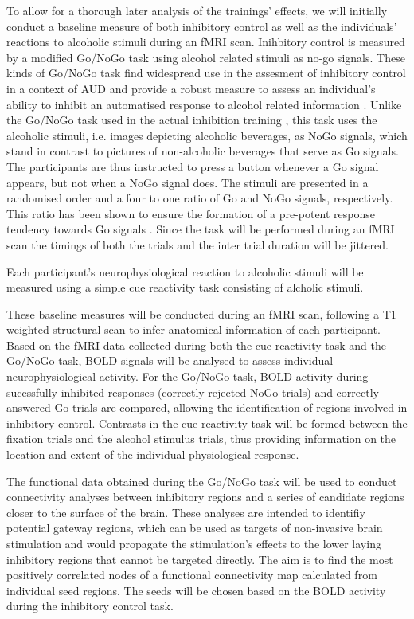 \documentclass[12pt]{article}
\begin{document}
To allow for a thorough later analysis of the trainings' effects, we will initially conduct a baseline measure of both inhibitory control as well as the individuals' reactions to alcoholic stimuli during an fMRI scan. Inihbitory control is measured by a modified Go/NoGo task using alcohol related stimuli as no-go signals. These kinds of Go/NoGo task find widespread use in the assesment of inhibitory control in a context of AUD and provide a robust measure to assess an individual's ability to inhibit an automatised response to alcohol related information \parencite{amesNeuralCorrelatesGo2014,bowleyEffectsInhibitoryControl2013,roseEffectsAlcoholInhibitory2008,simmondsMetaanalysisGoNogo2008}. Unlike the Go/NoGo task used in the actual inhibition training \parencite{houbenBeerNogoLearning2012}, this task uses the alcoholic stimuli, i.e. images depicting alcoholic beverages, as NoGo signals, which stand in contrast to pictures of non-alcoholic beverages that serve as Go signals. The participants are thus instructed to press a button whenever a Go signal appears, but not when a NoGo signal does. The stimuli are presented in a randomised order and a four to one ratio of Go and NoGo signals, respectively. This ratio has been shown to ensure the formation of a pre-potent response tendency towards Go signals \parencite{amesNeuralCorrelatesGo2014}. Since the task will be performed during an fMRI scan the timings of both the trials and the inter trial duration will be jittered.

Each participant's neurophysiological reaction to alcoholic stimuli will be measured using a simple cue reactivity task consisting of alcholic stimuli. 

These baseline measures will be conducted during an fMRI scan, following a T1 weighted structural scan to infer anatomical information of each participant. Based on the fMRI data collected during both the cue reactivity task and the Go/NoGo task, BOLD signals will be analysed to assess individual neurophysiological activity. For the Go/NoGo task, BOLD activity during sucessfully inhibited responses (correctly rejected NoGo trials) and correctly answered Go trials are compared, allowing the identification of regions involved in inhibitory control. Contrasts in the cue reactivity task will be formed between the fixation trials and the alcohol stimulus trials, thus providing information on the location and extent of the individual physiological response.

The functional data obtained during the Go/NoGo task will be used to conduct connectivity analyses between inhibitory regions and a series of candidate regions closer to the surface of the brain. These analyses are intended to identifiy potential gateway regions, which can be used as targets of non-invasive brain stimulation and would propagate the stimulation's effects to the lower laying inhibitory regions that cannot be targeted directly. The aim is to find the most positively correlated nodes of a functional connectivity map calculated from individual seed regions. The seeds will be chosen based on the BOLD activity during the inhibitory control task.
\end{document}
